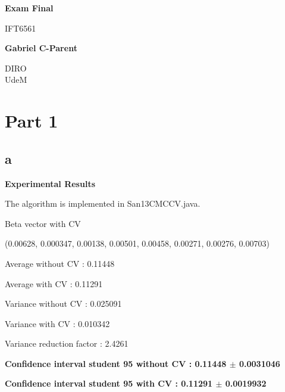 \documentclass[12pt]{report}
\begin{document}
 
    \begin{center}
        \vspace*{1cm}
        
        \textbf{Exam Final}
        
        \vspace{1.5cm}
		IFT6561
        
        \vspace{2.5cm}
        
        \textbf{Gabriel C-Parent}
        
        \vfill

        
        \vspace{0.8cm}

        DIRO\\
        UdeM\\
        \vfill
    \end{center}
\vfill
\newpage



\section*{Part 1}


\subsection*{a}
\textbf{Experimental Results}
\vspace{1 cm}


The algorithm is implemented in San13CMC\textunderscore CV.java.

Beta vector with CV

(0.00628, 0.000347, 0.00138, 0.00501, 0.00458, 0.00271, 0.00276, 0.00703)

Average without CV                         :  0.11448

Average with CV                            :  0.11291

Variance without CV                        : 0.025091

Variance with CV                           : 0.010342

Variance reduction factor                  :   2.4261

\textbf{Confidence interval student 95 without CV  :  0.11448 $\pm$ 0.0031046}

\textbf{Confidence interval student 95 with CV     :  0.11291 $\pm$ 0.0019932}


\vspace{0.5 cm}
\end{document}
